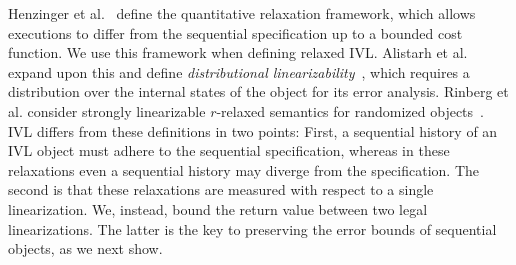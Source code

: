 Henzinger et al.~\cite{Henzinger} define
the quantitative relaxation framework, which
allows executions to differ from the sequential specification up to a bounded cost function.
We use this framework when defining relaxed IVL.
Alistarh et al.
expand upon this and define \emph{distributional linearizability}~\cite{alistarh2018distributionally},
which requires a distribution over the internal
states of the object for its error analysis.
Rinberg et al. consider strongly linearizable $r$-relaxed semantics for randomized objects~\cite{rinberg2019fast}.
IVL differs from these definitions in two points: First, a sequential history of an IVL object
must adhere to the sequential specification, whereas in these
relaxations even a sequential history may diverge from the specification. The second is that these relaxations
are measured with respect to a single linearization. We, instead, bound
the return value between two legal linearizations. The latter is the key to preserving the
error bounds of sequential objects, as we next show.